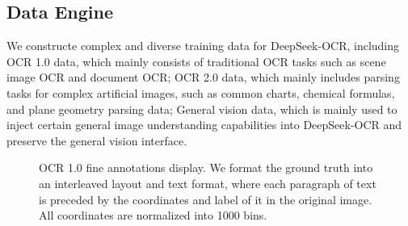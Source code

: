 \documentclass[11pt, a4paper, logo, copyright, nonumbering]{deepseek}
\begin{document}
\begin{CJK*}{UTF8}{gbsn}
\subsection{Data Engine}
\label{data}
We constructe complex and diverse training data for DeepSeek-OCR, including OCR 1.0 data, which mainly consists of traditional OCR tasks such as scene image OCR and document OCR; OCR 2.0 data, which mainly includes parsing tasks for complex artificial images, such as common charts, chemical formulas, and plane geometry parsing data; General vision data, which is mainly used to inject certain general image understanding capabilities into DeepSeek-OCR and preserve the general vision interface.

\begin{figure}[h]
    \centering
    \caption{OCR 1.0 fine annotations display. We format the ground truth into an interleaved layout and text format, where each paragraph of text is preceded by the coordinates and label of it in the original image. All coordinates are normalized into 1000 bins.}
    \label{fig:demo}


\end{figure}
\end{CJK*}
\end{document}
